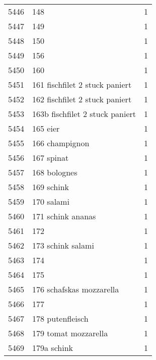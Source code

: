 \begin{tabular}{llr}
5446 &                                                148 &      1 \\
5447 &                                                149 &      1 \\
5448 &                                                150 &      1 \\
5449 &                                                156 &      1 \\
5450 &                                                160 &      1 \\
5451 &                     161 fischfilet 2 stuck paniert &      1 \\
5452 &                     162 fischfilet 2 stuck paniert &      1 \\
5453 &                    163b fischfilet 2 stuck paniert &      1 \\
5454 &                                           165 eier &      1 \\
5455 &                                     166 champignon &      1 \\
5456 &                                         167 spinat &      1 \\
5457 &                                       168 bolognes &      1 \\
5458 &                                         169 schink &      1 \\
5459 &                                         170 salami &      1 \\
5460 &                                  171 schink ananas &      1 \\
5461 &                                                172 &      1 \\
5462 &                                  173 schink salami &      1 \\
5463 &                                                174 &      1 \\
5464 &                                                175 &      1 \\
5465 &                           176 schafskas mozzarella &      1 \\
5466 &                                                177 &      1 \\
5467 &                                   178 putenfleisch &      1 \\
5468 &                               179 tomat mozzarella &      1 \\
5469 &                                        179a schink &      1 \\

\end{tabular}
